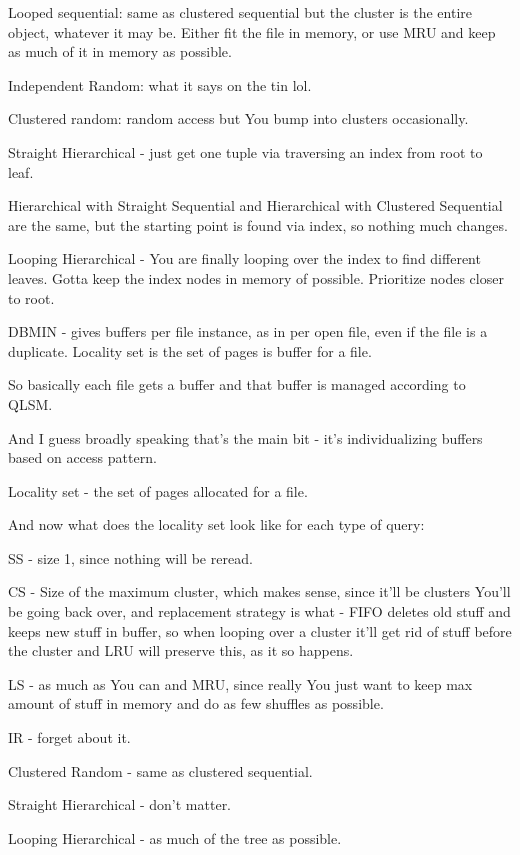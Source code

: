 \documentclass{article}
\begin{document}
	Looped sequential: same as clustered sequential but the cluster is the entire object, whatever it may be. Either fit the file in memory, or use MRU and keep as much of it in memory as possible.
	
	Independent Random: what it says on the tin lol.
	
	Clustered random: random access but You bump into clusters occasionally.
	
	Straight Hierarchical - just get one tuple via traversing an index from root to leaf.
	
	Hierarchical with Straight Sequential and Hierarchical with Clustered Sequential are the same, but the starting point is found via index, so nothing much changes.
	
	Looping Hierarchical - You are finally looping over the index to find different leaves. Gotta keep the index nodes in memory of possible. Prioritize nodes closer to root.
	
	DBMIN - gives buffers per file instance, as in per open file, even if the file is a duplicate. Locality set is the set of pages is buffer for a file.
	
	So basically each file gets a buffer and that buffer is managed according to QLSM.
	
	And I guess broadly speaking that's the main bit - it's individualizing buffers based on access pattern.
	
	Locality set - the set of pages allocated for a file.
	
	And now what does the locality set look like for each type of query:
	
	SS - size 1, since nothing will be reread.
	
	CS - Size of the maximum cluster, which makes sense, since it'll be clusters You'll be going back over, and replacement strategy is what - FIFO deletes old stuff and keeps new stuff in buffer, so when looping over a cluster it'll get rid of stuff before the cluster and LRU will preserve this, as it so happens.
	
	LS - as much as You can and MRU, since really You just want to keep max amount of stuff in memory and do as few shuffles as possible.
	
	IR - forget about it.
	
	Clustered Random - same as clustered sequential.
	
	Straight Hierarchical - don't matter.
	
	Looping Hierarchical - as much of the tree as possible.
	
\end{document}
